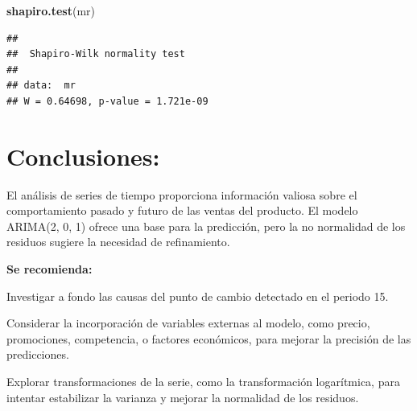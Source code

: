 \documentclass[
]{book}
\newenvironment{Shaded}{\begin{snugshade}}{\end{snugshade}}
\newcommand{\FunctionTok}[1]{\textcolor[rgb]{0.13,0.29,0.53}{\textbf{#1}}}
\newcommand{\NormalTok}[1]{#1}
\begin{document}
\begin{Shaded}
\begin{Highlighting}[]
\FunctionTok{shapiro.test}\NormalTok{(mr)}
\end{Highlighting}
\end{Shaded}

\begin{verbatim}
## 
##  Shapiro-Wilk normality test
## 
## data:  mr
## W = 0.64698, p-value = 1.721e-09
\end{verbatim}

\section{Conclusiones:}\label{conclusiones}

El análisis de series de tiempo proporciona información valiosa sobre el comportamiento pasado y futuro de las ventas del producto. El modelo ARIMA(2, 0, 1) ofrece una base para la predicción, pero la no normalidad de los residuos sugiere la necesidad de refinamiento.

\textbf{Se recomienda:}

Investigar a fondo las causas del punto de cambio detectado en el periodo 15.

Considerar la incorporación de variables externas al modelo, como precio, promociones, competencia, o factores económicos, para mejorar la precisión de las predicciones.

Explorar transformaciones de la serie, como la transformación logarítmica, para intentar estabilizar la varianza y mejorar la normalidad de los residuos.

  
\end{document}
